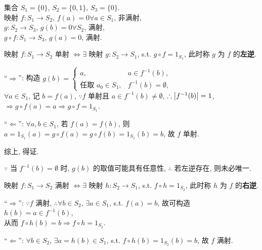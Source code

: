 \documentclass{note}
\begin{document}
\begin{itemize}
    \begin{eg}
        集合 $S_1=\{0\}$, $S_2=\{0,1\}$, $S_3=\{0\}$.\\
        映射 $f:S_1\rightarrow S_2$, $f(a)=0\forall a\in S_1$, 非满射,\\
        $g:S_2\rightarrow S_3$, $g(b)=0\forall S_2$, 满射,\\
        $g\circ f:S_1\rightarrow S_3$, $g(a)=0$, 满射.
    \end{eg}
\end{itemize}

\begin{thm}\label{left inverse}
    映射 $f:S_1\rightarrow S_2$ 单射 $\Longleftrightarrow\exists$ 映射 $g:S_2\rightarrow S_1$, s.t. $g\circ f=1_{S_1}$, 此时称 $g$ 为 $f$ 的\textbf{左逆}.
\end{thm}
\begin{pf}
    ``$\Longrightarrow$'': 构造 $g(b)=\left\{\begin{array}{ll}
        a,&a\in f^{-1}(b),\\
        \text{任取 }a_0\in S_1,&f^{-1}(b)=\emptyset,
    \end{array}\right.$\\
    $\forall a\in S_1$, 记 $b=f(a)$, $\because f$ 单射且 $a\in f^{-1}(b)\neq\emptyset$, $\therefore\left\lvert f^{-1}(b)\right\rvert=1$,\\
    $\Longrightarrow g\circ f(a)=a\Longrightarrow g\circ f=1_{S_1}$.

    ``$\Longleftarrow$'': $\forall a,b\in S_1$, 若 $f(a)=f(b)$, 则 $a=1_{S_1}(a)=g\circ f(a)=g\circ f(b)=1_{S_1}(b)=b$, 故 $f$ 单射.

    综上, 得证.
\end{pf}

$\because$ 当 $f^{-1}(b)=\emptyset$ 时, $g(b)$ 的取值可能具有任意性, $\therefore$ 若左逆存在, 则未必唯一.

\begin{thm}\label{right inverse}
    映射 $f:S_1\rightarrow S_2$ 满射 $\Longleftrightarrow\exists$ 映射 $h:S_2\rightarrow S_1$, s.t. $f\circ h=1_{S_2}$, 此时称 $h$ 为 $f$ 的\textbf{右逆}.
\end{thm}
\begin{pf}
    ``$\Longrightarrow$'': $\because f$ 满射, $\therefore\forall b\in S_2$, $\exists a\in S_1$, s.t. $f(a)=b$, 故可构造 $h(b)=a\in f^{-1}(b)$,\\
    从而 $f\circ h(b)=b\Longrightarrow f\circ h=1_{S_2}$.

    ``$\Longleftarrow$'': $\forall b\in S_2$, $\exists a=h(b)\in S_1$, s.t. $f\circ h(b)=1_{S_2}(b)=b$, 故 $f$ 满射.
\end{pf}
\end{document}
